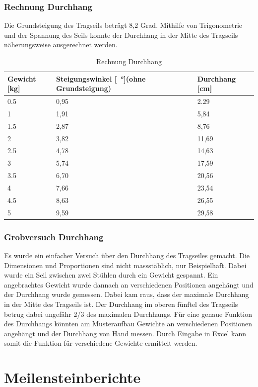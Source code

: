 \documentclass[a4paper]{report}
\begin{document}
\subsection{Rechnung Durchhang}
\label{ssec:RechDurch}
Die Grundsteigung des Tragseils beträgt 8,2 Grad. Mithilfe von Trigonometrie und der Spannung des Seils konnte der Durchhang in der Mitte des Tragseils näherungsweise ausgerechnet werden.

\vspace{1em}
\noindent
\begin{table}[h!]
	\begin{tabular}{|p{}|p{}|p{}|}
		\hline
		\textbf{Gewicht [kg]} & \textbf{Steigungswinkel [\SI{}{\degree}](ohne Grundsteigung)} &\textbf{Durchhang [cm]}\\
		\hline
		0.5&0,95&2.29\\
		\hline
		1&1,91&5,84\\
		\hline
		1.5&2,87&8,76\\
		\hline
		2&3,82&11,69\\
		\hline
		2.5&4,78&14,63\\
		\hline
		3&5,74&17,59\\
		\hline
		3.5&6,70&20,56\\
		\hline
		4&7,66&23,54\\
		\hline
		4.5&8,63&26,55\\
		\hline
		5&9,59&29,58\\
		\hline
	\end{tabular}
	\caption{Rechnung Durchhang}
	\label{tbl:DurchhangRechnung}
\end{table}


\subsection{Grobversuch Durchhang}
\label{app:ssec:GrobeversDurch}
Es wurde ein einfacher Versuch über den Durchhang des Tragseiles gemacht. Die Dimensionen und Proportionen sind nicht massstäblich, nur Beispielhaft. Dabei wurde ein Seil zwischen zwei Stühlen durch ein Gewicht gespannt. Ein angebrachtes Gewicht wurde dannach an verschiedenen Positionen angehängt und der Durchhang wurde gemessen. Dabei kam raus, dass der maximale Durchhang in der Mitte des Tragseils ist. Der Durchhang im oberen fünftel des Tragseils betrug dabei ungefähr 2/3 des maximalen Durchhangs.
Für eine genaue Funktion des Durchhangs könnten am Musteraufbau Gewichte an verschiedenen Positionen angehängt und der Durchhang von Hand messen. Durch Eingabe in Excel kann somit die Funktion für verschiedene Gewichte ermittelt werden.

\chapter{Meilensteinberichte}
\label{app:ch:MeilensteinBerichte}


\end{document}

